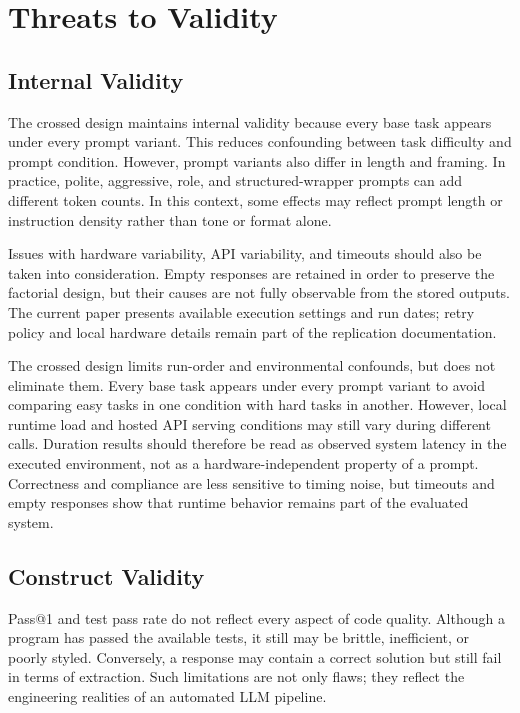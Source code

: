 \documentclass{llncs}
\begin{document}
\section{Threats to Validity}\label{threats-to-validity}

\subsection{Internal Validity}\label{internal-validity}

The crossed design maintains internal validity because every base task appears under every prompt variant. This reduces confounding between task difficulty and prompt condition. However, prompt variants also differ in length and framing. In practice, polite, aggressive, role, and structured-wrapper prompts can add different token counts. In this context, some effects may reflect prompt length or instruction density rather than tone or format alone.

Issues with hardware variability, API variability, and timeouts should also be taken into consideration. Empty responses are retained in order to preserve the factorial design, but their causes are not fully observable from the stored outputs. The current paper presents available execution settings and run dates; retry policy and local hardware details remain part of the replication documentation.

The crossed design limits run-order and environmental confounds, but does not eliminate them. Every base task appears under every prompt variant to avoid comparing easy tasks in one condition with hard tasks in another. However, local runtime load and hosted API serving conditions may still vary during different calls. Duration results should therefore be read as observed system latency in the executed environment, not as a hardware-independent property of a prompt. Correctness and compliance are less sensitive to timing noise, but timeouts and empty responses show that runtime behavior remains part of the evaluated system.

\subsection{Construct Validity}\label{construct-validity}

Pass@1 and test pass rate do not reflect every aspect of code quality. Although a program has passed the available tests, it still may be brittle, inefficient, or poorly styled. Conversely, a response may contain a correct solution but still fail in terms of extraction. Such limitations are not only flaws; they reflect the engineering realities of an automated LLM pipeline.
\end{document}

